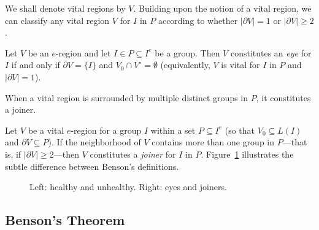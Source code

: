 We shall denote vital regions by $V$. Building upon the notion of a vital region, we can classify any vital region $V$ for $I$ in $P$ according to whether $|\partial V| = 1$ or $|\partial V| \ge 2$.

\begin{definition}[Eye]\label{def:eye}
	Let $V$ be an $e$-region and let $I \in P \subseteq I^e$ be a group. Then $V$ constitutes an \emph{eye} for $I$ if and only if $\partial V = \{I\}$ and $V_0 \cap V^\circ = \emptyset$ (equivalently, $V$ is vital for $I$ in $P$ and $|\partial V| = 1$).
\end{definition}

When a vital region is surrounded by multiple distinct groups in $P$, it constitutes a joiner.

\begin{definition}[Joiner]\label{def:joiner}
	Let $V$ be a vital $e$-region for a group $I$ within a set $P \subseteq I^e$ (so that $V_0 \subseteq L(I)$ and $\partial V \subseteq P$). If the neighborhood of $V$ contains more than one group in $P$---that is, if $|\partial V| \ge 2$---then $V$ constitutes a \emph{joiner} for $I$ in $P$. Figure~\ref{fig:benson_ejemplos} illustrates the subtle difference between Benson's definitions.
\end{definition}

\begin{figure}[H]
	\centering
	\begin{goban}[7, hoshi = false]
	\end{goban}
	\quad
	\begin{goban}[7, hoshi = false]
	\end{goban}
	\caption{Left: \textcolor{terracotta}{healthy} and \textcolor{Moss}{unhealthy}. Right: \textcolor{sealred}{eyes} and \textcolor{bg}{joiners}.}
	\label{fig:benson_ejemplos}
\end{figure}

\subsection{Benson's Theorem}

